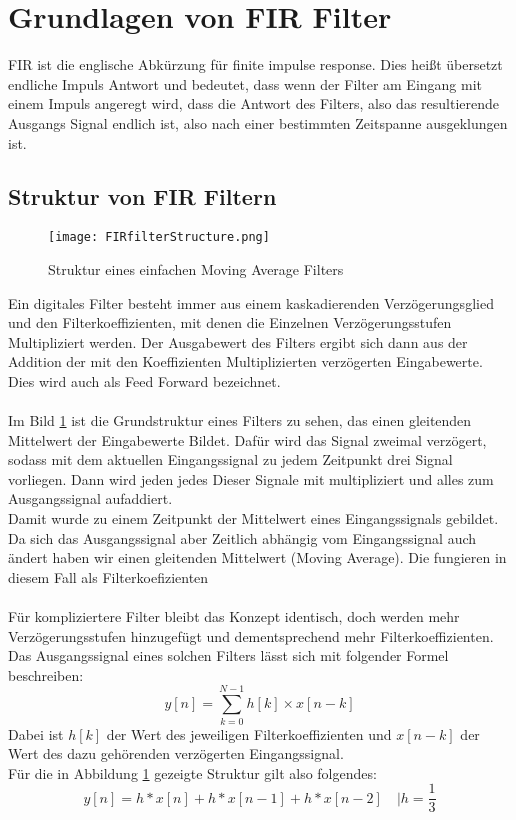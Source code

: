 \documentclass[
paper = a4,
fontsize = 11pt,
numbers=noenddot,
headsepline = true,
footsepline = true,
plainfootsepline = true,
parskip,								        %
listof = totoc,
bibliography = totoc,
index = totoc,
twoside = false
]{scrreprt}
\begin{document}
	\section{Grundlagen von FIR Filter}
	FIR ist die englische Abkürzung für finite impulse response. Dies heißt übersetzt endliche Impuls Antwort und bedeutet, dass wenn der Filter am Eingang mit einem Impuls angeregt wird, dass die Antwort des Filters, also das resultierende Ausgangs Signal endlich ist, also nach einer bestimmten Zeitspanne ausgeklungen ist.\\
	\subsection{Struktur von FIR Filtern}

	
	\begin{figure}[!h]
		\texttt{[image: FIRfilterStructure.png]}
		\caption{Struktur eines einfachen Moving Average Filters\cite{Zoelzer}}
		\label{fig:FIRfilterStructure}
	\end{figure}

	Ein digitales Filter besteht immer aus einem kaskadierenden Verzögerungsglied und den Filterkoeffizienten, mit denen die Einzelnen Verzögerungsstufen Multipliziert werden. Der Ausgabewert des Filters ergibt sich dann aus der Addition der mit den Koeffizienten Multiplizierten verzögerten Eingabewerte. Dies wird auch als Feed Forward bezeichnet.\\
	\\
	Im Bild \ref{fig:FIRfilterStructure} ist die Grundstruktur eines Filters zu sehen, das einen gleitenden Mittelwert der Eingabewerte Bildet. Dafür wird das Signal zweimal verzögert, sodass mit dem aktuellen Eingangssignal zu jedem Zeitpunkt drei Signal vorliegen. Dann wird jeden jedes Dieser Signale mit  multipliziert und alles zum Ausgangssignal aufaddiert.\\
	Damit wurde zu einem Zeitpunkt der Mittelwert eines Eingangssignals gebildet. Da sich das Ausgangssignal aber Zeitlich abhängig vom Eingangssignal auch ändert haben wir einen gleitenden Mittelwert (Moving Average). Die  fungieren in diesem Fall als Filterkoefizienten\\
	\\
	Für kompliziertere Filter bleibt das Konzept identisch, doch werden mehr Verzögerungsstufen hinzugefügt und dementsprechend mehr Filterkoeffizienten.\\
	Das Ausgangssignal eines solchen Filters lässt sich mit folgender Formel beschreiben:
	$$y[n] = \sum_{k=0}^{N-1}h[k]\times x[n-k]$$
	Dabei ist $h[k]$ der Wert des jeweiligen Filterkoeffizienten und $x[n-k]$ der Wert des dazu gehörenden verzögerten Eingangssignal.\\
	Für die in Abbildung \ref{fig:FIRfilterStructure} gezeigte Struktur gilt also folgendes:
	$$y[n] = h * x[n] + h * x[n-1] + h * x[n-2]\quad |h = \frac{1}{3}$$
	  
\end{document}
